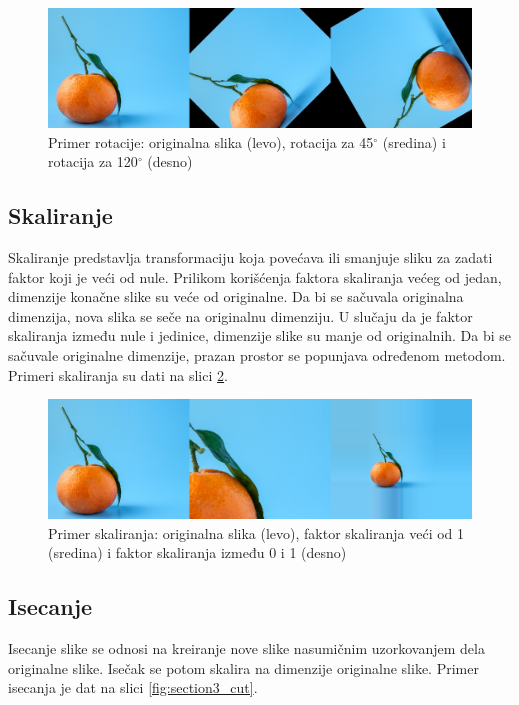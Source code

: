 \documentclass[12pt,oneside]{memoir}
\begin{document}
\begin{figure}[ht]
    \centering
    \includegraphics[width=1\textwidth]{matfmaster/glava3/rotate.jpg}
    \caption{Primer rotacije: originalna slika (levo), rotacija za 45\(^\circ\) (sredina) i  rotacija za 120\(^\circ\) (desno) \cite{unsplashOrange}}
    \label{fig:section3_rot}
\end{figure}

\subsection{Skaliranje}
Skaliranje predstavlja transformaciju koja povećava ili smanjuje sliku za zadati faktor koji je veći od nule. Prilikom korišćenja faktora skaliranja većeg od jedan, dimenzije konačne slike su veće od originalne. Da bi se sačuvala originalna dimenzija, nova slika se seče na originalnu dimenziju. U slučaju da je faktor skaliranja između nule i jedinice, dimenzije slike su manje od originalnih. Da bi se sačuvale originalne dimenzije, prazan prostor se popunjava određenom metodom. Primeri skaliranja su dati na slici \ref{fig:section3_scale}.

\begin{figure}[ht]
    \centering
    \includegraphics[width=1\textwidth]{matfmaster/glava3/scale.jpg}
    \caption{Primer skaliranja: originalna slika (levo), faktor skaliranja veći od 1 (sredina) i faktor skaliranja između 0 i 1 (desno) \cite{unsplashOrange}}
    \label{fig:section3_scale}
\end{figure}


\subsection{Isecanje}
Isecanje slike se odnosi na kreiranje nove slike nasumičnim uzorkovanjem dela originalne slike. Isečak se potom skalira na dimenzije originalne slike. Primer isecanja je dat na slici \ref{fig:section3_cut}.
 
\end{document}
